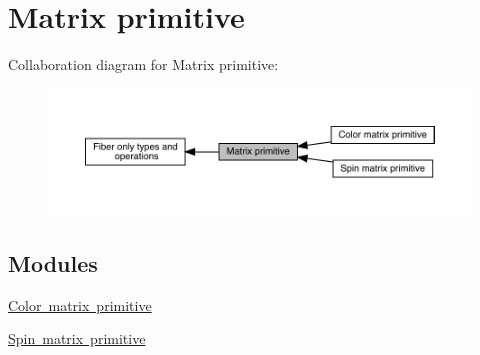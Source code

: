 \hypertarget{group__primmatrix}{}\section{Matrix primitive}
\label{group__primmatrix}
Collaboration diagram for Matrix primitive\+:\nopagebreak
\begin{figure}[H]
\begin{center}
\leavevmode
\includegraphics[width=350pt]{df/d0a/group__primmatrix}
\end{center}
\end{figure}
\subsection*{Modules}
\begin{DoxyCompactItemize}
\item 
\mbox{\hyperlink{group__primcolormatrix}{Color matrix primitive}}
\item 
\mbox{\hyperlink{group__primspinmatrix}{Spin matrix primitive}}
\end{DoxyCompactItemize}
